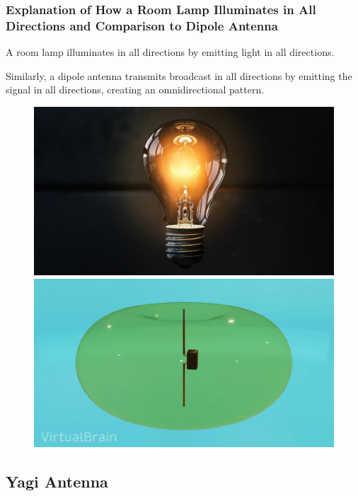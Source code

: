 \documentclass{beamer}
\begin{document}
\begin{frame}
\frametitle{Explanation of How a Room Lamp Illuminates in All Directions and Comparison to Dipole Antenna}


A room lamp illuminates in all directions by emitting light in all directions.

Similarly, a dipole antenna transmits broadcast in all directions by emitting the signal in all directions, creating an omnidirectional pattern.


        \begin{figure}[htbp]
        \begin{minipage}[b]{0.5\linewidth}
            \centering
            \includegraphics[width=0.8\linewidth]{bulb.jpg}
    
            \end{minipage}%
            \begin{minipage}[b]{0.5\linewidth}
            \centering
            \includegraphics[width=0.8\linewidth]{diprad.png}
        \end{minipage}
        \end{figure}

\end{frame}


\subsection{Yagi Antenna}
\end{document}
